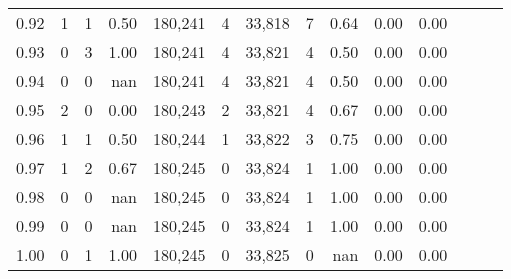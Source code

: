 \begin{tabular}{rrrrrrrrrrrrrr}
0.92 &      1 &      1 &  0.50 &  180,241 &        4 &  33,818 &       7 &  0.64 &  0.00 &      0.00 \\
0.93 &      0 &      3 &  1.00 &  180,241 &        4 &  33,821 &       4 &  0.50 &  0.00 &      0.00 \\
0.94 &      0 &      0 &   nan &  180,241 &        4 &  33,821 &       4 &  0.50 &  0.00 &      0.00 \\
0.95 &      2 &      0 &  0.00 &  180,243 &        2 &  33,821 &       4 &  0.67 &  0.00 &      0.00 \\
0.96 &      1 &      1 &  0.50 &  180,244 &        1 &  33,822 &       3 &  0.75 &  0.00 &      0.00 \\
0.97 &      1 &      2 &  0.67 &  180,245 &        0 &  33,824 &       1 &  1.00 &  0.00 &      0.00 \\
0.98 &      0 &      0 &   nan &  180,245 &        0 &  33,824 &       1 &  1.00 &  0.00 &      0.00 \\
0.99 &      0 &      0 &   nan &  180,245 &        0 &  33,824 &       1 &  1.00 &  0.00 &      0.00 \\
1.00 &      0 &      1 &  1.00 &  180,245 &        0 &  33,825 &       0 &   nan &  0.00 &      0.00 \\
\bottomrule
\end{tabular}

